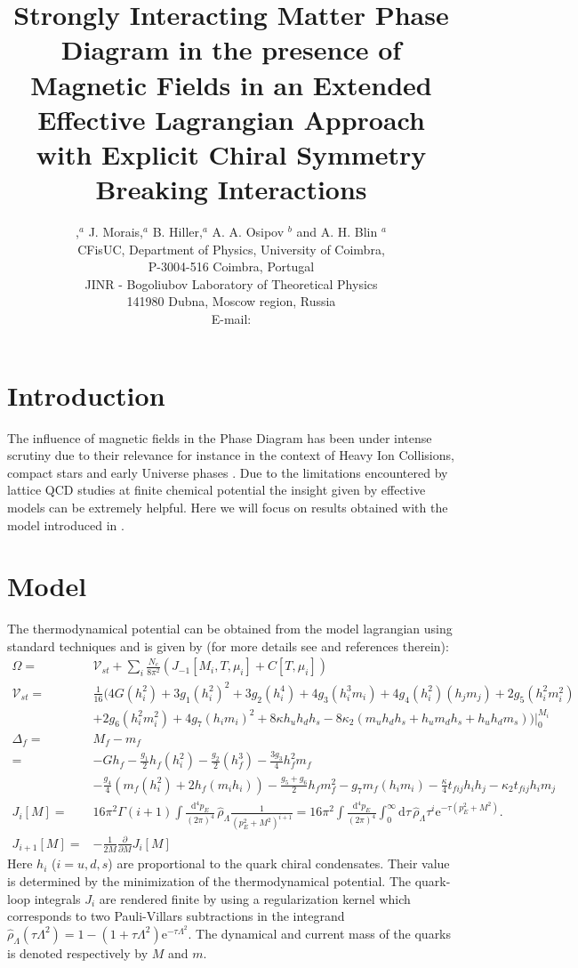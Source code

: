 \documentclass{PoS}
\title{Strongly Interacting Matter Phase Diagram in the presence of Magnetic Fields in an Extended Effective Lagrangian Approach with Explicit Chiral Symmetry Breaking Interactions}
\author{\speaker{J. Moreira},$^a$ J. Morais,$^a$ B. Hiller,$^a$ A. A. Osipov $^b$ and A. H. Blin $^a$ 
				\\
				\llap{$ˆa$} CFisUC, Department of Physics, University of Coimbra,\\
				P-3004-516 Coimbra, Portugal\\
				\llap{$ˆb$} JINR - Bogoliubov Laboratory of Theoretical Physics\\
				141980 Dubna, Moscow region, Russia\\
        E-mail: \email{jmoreira@fis.uc.pt}}
\begin{document}
\section{Introduction}

The influence of magnetic fields in the Phase Diagram has been under intense scrutiny due to their relevance for instance in the context of Heavy Ion Collisions, compact stars and early Universe phases \cite{Andersen:2014xxa}. Due to the limitations encountered by lattice QCD studies at finite chemical potential the insight given by effective models can be extremely helpful. Here we will focus on results obtained with the model introduced in \cite{Osipov:2012kk, Osipov:2013fka}.

\section{Model}
The thermodynamical potential can be obtained from the model lagrangian using standard techniques and is given by (for more details see \cite{NJLH8qPD_PRD81_2010,NJLH8qmPD_PRD91_2015} and references therein): 
\begin{align}
\Omega=&\mathcal{V}_{st}+\sum_i\frac{N_c}{8\pi^2}\left(J_{-1}\left[M_i,T,\mu_i\right]+C\left[T,\mu_i\right]\right)\\	
\mathcal{V}_{st}=&\frac{1}{16}\bigg(4 G \left(h_i^2\right) + 3 g_1 \left(h_i^2\right)^2 + 3 g_2 \left(h_i^4\right) + 4 g_3 \left(h_i^3 m_i\right)
			+ 4 g_4 \left(h_i^2\right) \left(h_j m_j\right) + 2 g_5 \left(h_i^2 m_i^2\right)  \nonumber\\ 
	    &+ 2 g_6 \left(h_i^2 m_i^2\right)+ 4 g_7 \left(h_i m_i\right)^2 + 8 \kappa h_u h_d h_s -8 \kappa_2 \left( m_u h_d h_s + h_u m_d h_s +  h_u h_d m_s\right)\bigg)\bigg|^{M_i}_0\nonumber\\
\Delta_f=&  M_f-m_f\nonumber\\ 
        =& -G h_f -\frac{g_1}{2} h_f(h_i^2) - \frac{g_2}{2} (h_f^3) - \frac{3 g_3}{4} h_f^2 m_f\nonumber\\
				 &-\frac{  g_4}{4} \left( m_f \left(h_i^2\right)+2 h_f(m_i h_i)\right) - \frac{g_5 + g_6}{2} h_f m_f^2
				- g_7 m_f (h_i m_i) - \frac{\kappa}{4} t_{fij}h_i h_j - \kappa_2 t_{fij}h_i m_j\nonumber\\				
J_i\left[M\right]=&16\pi^2\Gamma (i+1)\!\int  \frac{\mathrm{d}^4p_E}{(2\pi)^4}\,\hat\rho_\Lambda \frac{1}{(p_E^2+M^2)^{i+1}}%
								 =
								16\pi^2\!\int  \frac{\mathrm{d}^4p_E}{(2\pi)^4} \int^\infty_0 \mathrm{d}\tau \,\hat\rho_\Lambda\tau^{i}\mathrm{e}^{-\tau (p_E^2+M^2)}. \nonumber\\
J_{i+1}\left[M\right]=&-\frac{1}{2M}\frac{\partial}{\partial M}J_{i}\left[M\right]\nonumber
\end{align}
Here $h_i$ ($i=u, d, s$) are proportional to the quark chiral condensates. Their value is determined by the minimization of the thermodynamical potential. The quark-loop integrals $J_i$ are rendered finite by using a regularization kernel which corresponds to two Pauli-Villars subtractions in the integrand $\hat\rho_\Lambda\left(\tau\Lambda^2\right)=1-(1+\tau\Lambda^2)\mathrm{e}^{-\tau\Lambda^2}$. The dynamical and current mass of the quarks is denoted respectively by $M$ and $m$.
\end{document}
